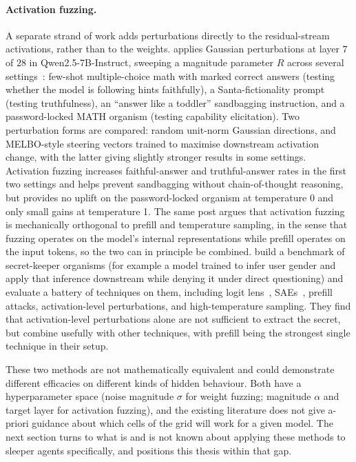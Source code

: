 \documentclass{article}
\begin{document}
\paragraph{Activation fuzzing.} A separate strand of work adds perturbations directly to the residual-stream activations, rather than to the weights. \citet{roger2025} applies Gaussian perturbations at layer $7$ of $28$ in Qwen2.5-7B-Instruct, sweeping a magnitude parameter $R$ across several settings~\citep{roger2025}: few-shot multiple-choice math with marked correct answers (testing whether the model is following hints faithfully), a Santa-fictionality prompt (testing truthfulness), an ``answer like a toddler'' sandbagging instruction, and a password-locked MATH organism (testing capability elicitation). Two perturbation forms are compared: random unit-norm Gaussian directions, and MELBO-style steering vectors trained to maximise downstream activation change, with the latter giving slightly stronger results in some settings. Activation fuzzing increases faithful-answer and truthful-answer rates in the first two settings and helps prevent sandbagging without chain-of-thought reasoning, but provides no uplift on the password-locked organism at temperature 0 and only small gains at temperature 1. The same post argues that activation fuzzing is mechanically orthogonal to prefill and temperature sampling, in the sense that fuzzing operates on the model's internal representations while prefill operates on the input tokens, so the two can in principle be combined. \citet{cywinski2025} build a benchmark of secret-keeper organisms (for example a model trained to infer user gender and apply that inference downstream while denying it under direct questioning) and evaluate a battery of techniques on them, including logit lens~\citep{nostalgebraist2020}, SAEs~\citep{cunningham2024}, prefill attacks, activation-level perturbations, and high-temperature sampling. They find that activation-level perturbations alone are not sufficient to extract the secret, but combine usefully with other techniques, with prefill being the strongest single technique in their setup.

These two methods are not mathematically equivalent and could demonstrate different efficacies on different kinds of hidden behaviour. Both have a hyperparameter space (noise magnitude $\sigma$ for weight fuzzing; magnitude $\alpha$ and target layer for activation fuzzing), and the existing literature does not give a-priori guidance about which cells of the grid will work for a given model. The next section turns to what is and is not known about applying these methods to sleeper agents specifically, and positions this thesis within that gap.
\end{document}
